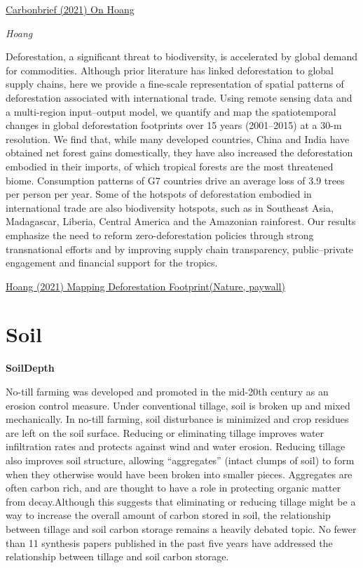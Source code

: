 \documentclass[
]{book}
\begin{document}
\href{https://www.carbonbrief.org/scientists-calculate-trade-related-deforestation-footprint-of-rich-countries}{Carbonbrief (2021) On Hoang}

\emph{Hoang}

Deforestation, a significant threat to biodiversity, is accelerated by global demand for commodities. Although prior literature has linked deforestation to global supply chains, here we provide a fine-scale representation of spatial patterns of deforestation associated with international trade. Using remote sensing data and a multi-region input--output model, we quantify and map the spatiotemporal changes in global deforestation footprints over 15 years (2001--2015) at a 30-m resolution. We find that, while many developed countries, China and India have obtained net forest gains domestically, they have also increased the deforestation embodied in their imports, of which tropical forests are the most threatened biome. Consumption patterns of G7 countries drive an average loss of 3.9 trees per person per year. Some of the hotspots of deforestation embodied in international trade are also biodiversity hotspots, such as in Southeast Asia, Madagascar, Liberia, Central America and the Amazonian rainforest. Our results emphasize the need to reform zero-deforestation policies through strong transnational efforts and by improving supply chain transparency, public--private engagement and financial support for the tropics.

\href{https://www.nature.com/articles/s41559-021-01417-z}{Hoang (2021) Mapping Deforestation Footprint(Nature, paywall)}

\hypertarget{soil}{%
\section{Soil}\label{soil}}

\textbf{SoilDepth}

No-till farming was developed and promoted in the mid-20th century as an erosion control measure. Under conventional tillage, soil is broken up and mixed mechanically. In no-till farming, soil disturbance is minimized and crop residues are left on the soil surface. Reducing or eliminating tillage improves water infiltration rates and protects against wind and water erosion. Reducing tillage also improves soil structure, allowing ``aggregates'' (intact clumps of soil) to form when they otherwise would have been broken into smaller pieces. Aggregates are often carbon rich, and are thought to have a role in protecting organic matter from decay.Although this suggests that eliminating or reducing tillage might be a way to increase the overall amount of carbon stored in soil, the relationship between tillage and soil carbon storage remains a heavily debated topic. No fewer than 11 synthesis papers published in the past five years have addressed the relationship between tillage and soil carbon storage.
\end{document}
